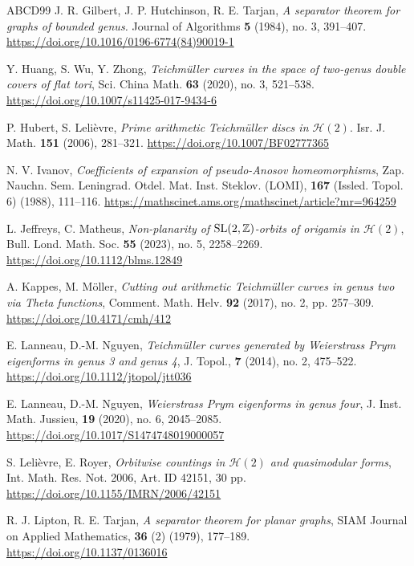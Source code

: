 \documentclass[a4paper,11pt]{amsart}
\numberwithin{equation}{section}
\numberwithin{figure}{section}
\numberwithin{table}{section}
\newcommand{\teichmuller}{Teichm{\"u}ller }
\newcommand{\calH}{\mathcal{H}}
\DeclareMathOperator{\SL}{{\rm{SL}}}
\begin{document}
\begin{thebibliography}{ABCD99}
 J. R. Gilbert, J. P. Hutchinson, R. E. Tarjan, {\em A separator theorem for graphs of bounded genus.} Journal of Algorithms \textbf{5} (1984), no. 3, 391--407. \url{https://doi.org/10.1016/0196-6774(84)90019-1}

 Y. Huang, S. Wu, Y. Zhong, {\em 
Teichm\"uller curves in the space of two-genus double covers of flat tori}, 
Sci. China Math. \textbf{63} (2020), no. 3, 521--538. \url{https://doi.org/10.1007/s11425-017-9434-6}

 P. Hubert, S. Leli\`evre, {\em Prime arithmetic \teichmuller discs in $\calH(2)$}. Isr. J. Math. \textbf{151} (2006), 281--321. \url{https://doi.org/10.1007/BF02777365}

 N. V. Ivanov, {\em Coefficients of expansion of pseudo-Anosov homeomorphisms}, Zap. Nauchn. Sem. Leningrad. Otdel. Mat. Inst. Steklov. (LOMI), \textbf{167} (Issled. Topol. 6) (1988), 111--116. \url{https://mathscinet.ams.org/mathscinet/article?mr=964259}

 L. Jeffreys, C. Matheus, {\em Non-planarity of $\SL(2,\mathbb{Z})$-orbits of origamis in $\mathcal{H}(2)$}, Bull. Lond. Math. Soc. \textbf{55} (2023), no. 5, 2258--2269. \url{https://doi.org/10.1112/blms.12849}

 A. Kappes, M. M\"oller, {\em Cutting out arithmetic Teichm\"uller curves in genus two via Theta functions}, Comment. Math. Helv. \textbf{92} (2017), no. 2, pp. 257--309. \url{https://doi.org/10.4171/cmh/412}

 E. Lanneau, D.-M. Nguyen, {\em \teichmuller curves generated by Weierstrass Prym eigenforms in genus 3 and genus 4}, J. Topol., \textbf{7} (2014), no. 2, 475--522. \url{https://doi.org/10.1112/jtopol/jtt036}

 E. Lanneau, D.-M. Nguyen, {\em Weierstrass Prym eigenforms in genus four}, J. Inst. Math. Jussieu, \textbf{19} (2020), no. 6, 2045--2085. \url{https://doi.org/10.1017/S1474748019000057}

 S. Leli\`evre, E. Royer, {\em Orbitwise countings in $\mathcal{H}(2)$ and quasimodular forms}, Int. Math. Res. Not. 2006, Art. ID 42151, 30 pp. \url{https://doi.org/10.1155/IMRN/2006/42151}

 R. J. Lipton, R. E. Tarjan, {\em A separator theorem for planar graphs}, SIAM Journal on Applied Mathematics, \textbf{36} (2) (1979), 177--189. \url{https://doi.org/10.1137/0136016}


\end{thebibliography}
\end{document}
